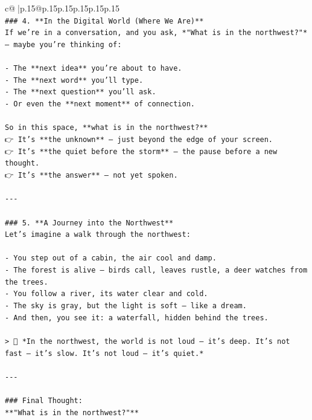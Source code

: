 \documentclass{article}
\begin{document}
{\begin{supertabular}{c@{$\;$}|p{.15\linewidth}@{}p{.15\linewidth}p{.15\linewidth}p{.15\linewidth}p{.15\linewidth}p{.15\linewidth}}
{{{\\ 
\texttt{\#\#\# 4. **In the Digital World (Where We Are)**  } \\
\texttt{If we’re in a conversation, and you ask, *"What is in the northwest?"* — maybe you’re thinking of:} \\
\\ 
\texttt{{-} The **next idea** you’re about to have.} \\
\texttt{{-} The **next word** you’ll type.} \\
\texttt{{-} The **next question** you’ll ask.} \\
\texttt{{-} Or even the **next moment** of connection.} \\
\\ 
\texttt{So in this space, **what is in the northwest?**  } \\
\texttt{👉 It’s **the unknown** — just beyond the edge of your screen.  } \\
\texttt{👉 It’s **the quiet before the storm** — the pause before a new thought.  } \\
\texttt{👉 It’s **the answer** — not yet spoken.} \\
\\ 
\texttt{{-}{-}{-}} \\
\\ 
\texttt{\#\#\# 5. **A Journey into the Northwest**  } \\
\texttt{Let’s imagine a walk through the northwest:} \\
\\ 
\texttt{{-} You step out of a cabin, the air cool and damp.} \\
\texttt{{-} The forest is alive — birds call, leaves rustle, a deer watches from the trees.} \\
\texttt{{-} You follow a river, its water clear and cold.} \\
\texttt{{-} The sky is gray, but the light is soft — like a dream.} \\
\texttt{{-} And then, you see it: a waterfall, hidden behind the trees.} \\
\\ 
\texttt{> 🌿 *In the northwest, the world is not loud — it’s deep. It’s not fast — it’s slow. It’s not loud — it’s quiet.*} \\
\\ 
\texttt{{-}{-}{-}} \\
\\ 
\texttt{\#\#\# Final Thought:  } \\
\texttt{**"What is in the northwest?"**  } \\
}}}
\end{supertabular}}
\end{document}
